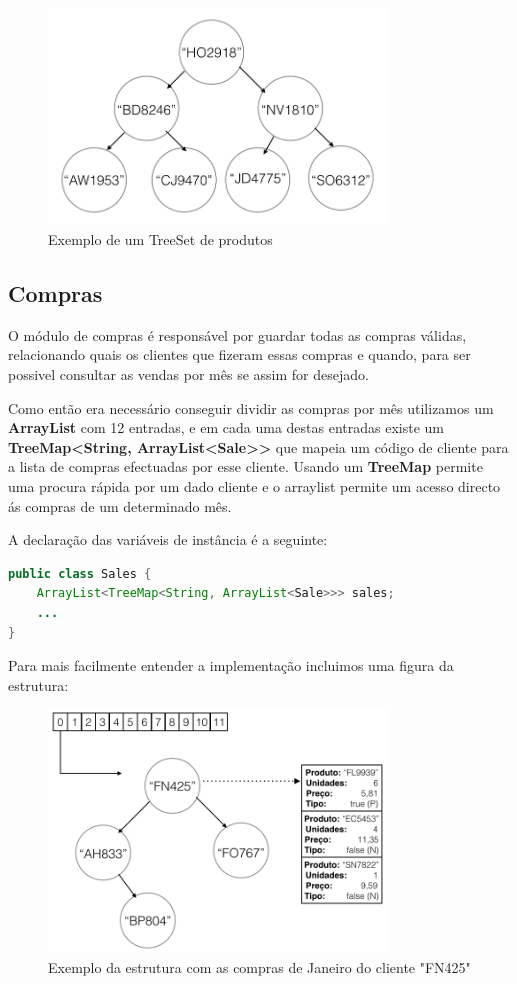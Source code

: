 \documentclass[10pt] {article}
\begin{document}
\begin{figure}[ht!]
\centering
\includegraphics[width=90mm]{catprodutos.png}
\caption{Exemplo de um TreeSet de produtos}
\label{fig:catprodutos}
\end{figure}

\subsection{Compras}
\par O módulo de compras é responsável por guardar todas as compras válidas, relacionando quais os clientes que fizeram
essas compras e quando, para ser possivel consultar as vendas por mês se assim for desejado.
\par Como então era necessário conseguir dividir as compras por mês utilizamos um \textbf{ArrayList} com 12 entradas, e
em cada uma destas entradas existe um \textbf{TreeMap\textless String, ArrayList\textless Sale\textgreater\textgreater} que
mapeia um código de cliente para a lista de compras efectuadas por esse cliente. Usando um \textbf{TreeMap} permite uma
procura rápida por um dado cliente e o arraylist permite um acesso directo ás compras de um determinado mês.
\par A declaração das variáveis de instância é a seguinte:

\begin{lstlisting}[language=Java]
public class Sales {
	ArrayList<TreeMap<String, ArrayList<Sale>>> sales;
	...
}
\end{lstlisting}

\par Para mais facilmente entender a implementação incluimos uma figura da estrutura:

\begin{figure}[ht!]
\centering
\includegraphics[width=90mm]{sales.png}
\caption{Exemplo da estrutura com as compras de Janeiro do cliente "FN425"}
\label{fig:sales}
\end{figure}
\end{document}
